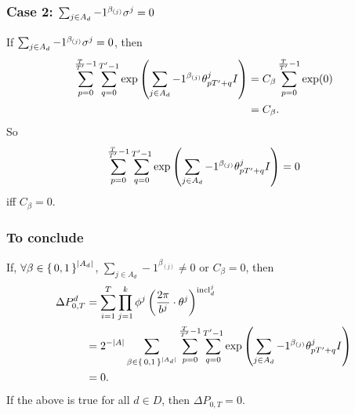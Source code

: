 \subsubsection*{Case 2: $\sum_{j \in A_d} -1 ^ {\beta_{(j)}} \sigma^j = 0$}
If $\sum_{j \in A_d} -1 ^ {\beta_{(j)}} \sigma^j = 0$, then 
\begin{align*}
  \sum_{p= 0}^{\frac{T}{{T}'} - 1} \sum_{q = 0}^{{T}' - 1} \exp\left( \sum_{j \in A_d} -1 ^ {\beta_{(j)}} {\theta^j_{p {T}' + q}}I \right) &= C_\beta \sum_{p= 0}^{\frac{T}{{T}'} - 1} \exp(0) \\
  &= C_\beta.
\end{align*}
So $$\sum_{p= 0}^{\frac{T}{{T}'} - 1} \sum_{q = 0}^{{T}' - 1} \exp\left( \sum_{j \in A_d} -1 ^ {\beta_{(j)}} {\theta^j_{p {T}' + q}}I \right) = 0$$ iff $C_\beta = 0$.

\subsubsection*{To conclude}
If, $\forall \beta \in \set{0, 1}^{|A_d|}$, $\sum_{j \in A_d} -1 ^ {\beta_{(j)}} \neq 0$
or $C_\beta = 0$, then
\begin{align*}
  \Delta P_{0, T}^d &= \sum_{i = 1}^T \prod_{j=1}^k \phi^j\left(\frac{2\pi}{b^j} \cdot \theta^j\right) ^ {{\mathrm{incl}_{d}^{j}}} \\&=  2^{-|A|}
  \sum_{\beta \in \set{0,1}^{|A_d|}} 
      \sum_{p= 0}^{\frac{T}{{T}'} - 1} \sum_{q = 0}^{{T}' - 1}
     \exp\left(
         \sum_{j \in A_d} -1 ^ {\beta_{(j)}}
         {\theta^j_{p {T}' + q}}I
       \right) \\
        &= 0.
\end{align*}
If the above is true for all $d \in D$, then 
$\Delta P_{0, T} = 0$.
